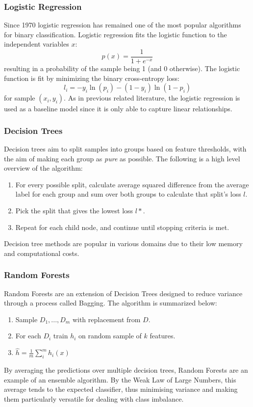 \documentclass[a4paper]{report}
\begin{document}
\subsubsection{Logistic Regression}
Since 1970 logistic regression has remained one of the most popular algorithms for binary classification. Logistic regression fits the logistic function to the independent variables \(x\):
\begin{equation}
  p(x) = \frac{1}{1 + e^{-x}}
\end{equation}
resulting in a probability of the sample being 1 (and 0 otherwise). The logistic function is fit by minimizing the binary cross-entropy loss: 
\begin{equation}
  l_{i} = -y_{i}\ln(p_i) - (1-y_i)\ln(1-p_i)
\end{equation}
for sample \((x_i, y_i)\). As in previous related literature, the logistic regression is used as a baseline model since it is only able to capture linear relationships.

\subsubsection{Decision Trees}
Decision trees aim to split samples into groups based on feature thresholds, with the aim of making each group as \textit{pure} as possible. The following is a high level overview of the algorithm:
\begin{enumerate}
  \item For every possible split, calculate average squared difference from the average label for each group and sum over both groups to calculate that split's loss \(l\).
  \item Pick the split that gives the lowest loss \(l*\).
  \item Repeat for each child node, and continue until stopping criteria is met.
\end{enumerate}
Decision tree methods are popular in various domains due to their low memory and computational costs.

\subsubsection{Random Forests}
Random Forests are an extension of Decision Trees designed to reduce variance through a process called Bagging. The algorithm is summarized below:
\begin{enumerate}
  \item Sample \(D_1,...,D_m\) with replacement from \(D\).
  \item For each \(D_i\) train \(h_i\) on random sample of \(k\) features.
  \item \( \hat{h} = \frac{1}{m} \sum_{i}^{m} h_i(x) \)
\end{enumerate}
By averaging the predictions over multiple decision trees, Random Forests are an example of an ensemble algorithm. By the Weak Law of Large Numbers, this average tends to the expected classifier, thus minimising variance and making 
them particularly versatile for dealing with class imbalance.
\end{document}

